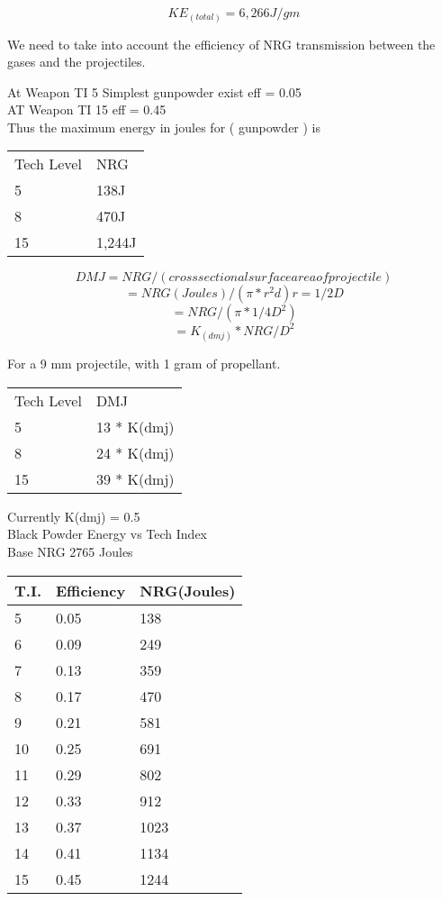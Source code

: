 \[KE_{(total)} = 6,266J/gm\]

We need to take into account the efficiency of NRG transmission 
between the gases and the projectiles. 

At Weapon TI 5 Simplest gunpowder exist	eff = 0.05 \\

AT Weapon TI 15 eff = 0.45 \\

Thus the maximum energy in joules for ( gunpowder ) is  

\begin{tabular}{ll} \hline
Tech Level  & NRG \\
	5 	    & 138J \\
	8	    & 470J \\
	15  	& 1,244J  \\ \hline 
\end{tabular}
                 
\[DMJ 	= NRG/(cross sectional surface area of projectile)\]
\[= NRG(Joules)/(\pi * r^{2}d)  r = 1/2 D \]
\[= NRG/(\pi * 1/4 D^{2}) \]
\[= K_{(dmj)} * NRG/D^{2} \]

For a 9 mm projectile, with 1 gram of propellant.

\begin{tabular}{ll} \hline 
Tech Level  & DMJ \\
	5		& 13 * K(dmj) \\
	8		& 24 * K(dmj) \\
	15		& 39 * K(dmj) \\ \hline 
\end{tabular}

Currently K(dmj) = 0.5 \\
Black Powder Energy vs Tech Index \\
Base NRG     2765 Joules \\

\begin{tabular}{lll} \hline 
T.I.   &  Efficiency    &    NRG(Joules) \\ \hline 
5	   &	0.05        &    138 \\
6		& 0.09          &    249 \\
7		& 0.13          &    359 \\
8		& 0.17          &    470 \\
9      	& 0.21          &    581 \\
10     	& 0.25          &    691 \\
11     	& 0.29          &    802 \\
12     	& 0.33          &    912 \\
13     	& 0.37          &    1023 \\
14     	& 0.41          &    1134 \\
15     	& 0.45          &    1244 \\ \hline 
\end{tabular}

